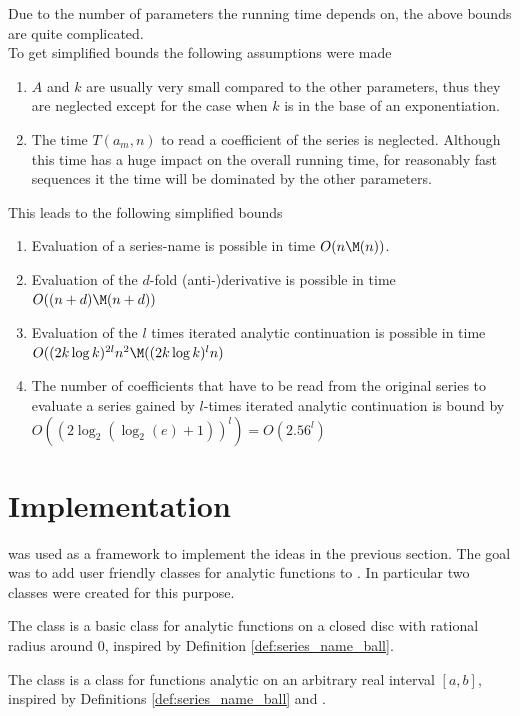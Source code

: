 		Due to the number of parameters the running time depends on, the above bounds are quite complicated.\\
		To get simplified bounds the following assumptions were made
		\begin{enumerate}
			\item $A$ and $k$ are usually very small compared to the other parameters, 
			thus they are neglected except for the case when $k$ is in the base of an exponentiation.
			\item The time $T(a_m, n)$ to read a coefficient of the series is neglected. 
			Although this time has a huge impact on the overall running time, for reasonably fast sequences it 
			the time will be dominated by the other parameters.
		\end{enumerate}
		This leads to the following simplified bounds
		\begin{enumerate}
			\item Evaluation of a series-name is possible in time $O(n\M(n))$.
			\item Evaluation of the $d$-fold (anti-)derivative is possible in time $O((n+d)\M(n+d))$
			\item Evaluation of the $l$ times iterated analytic continuation is possible in time $O((2k \log k)^{2l}n^2\M((2k\log k)^ln)$
			\item The number of coefficients that have to be read from the original series to evaluate a series gained by 
			$l$-times iterated analytic continuation is bound by $O((2\log_2(\log_2(e)+1))^l) = O(2.56^l)$
		\end{enumerate}

	\section{Implementation}
		\irram was used as a framework to implement the ideas in the previous section.
		The goal was to add user friendly classes for analytic functions to \irram.
		In particular two classes were created for this purpose.

		The class \baana is a basic class for analytic functions on 
		a closed disc with rational radius around $0$, inspired by Definition \ref{def:series_name_ball}.

		The class \anarect is a class for functions analytic on an arbitrary real interval $[a,b]$, 
		inspired by Definitions \ref{def:series_name_ball} and \label{def:series_name_rect}.

